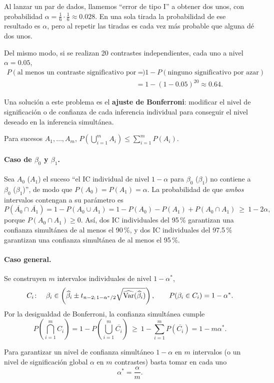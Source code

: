 \begin{ejemplo}
  Al lanzar un par de dados, llamemos ``error de tipo I'' a obtener dos unos, con probabilidad
  $\alpha=\frac16\cdot\frac16\approx0.028$. En una sola tirada la probabilidad de ese resultado
  es $\alpha$,
  pero al repetir las tiradas es cada vez más probable que alguna dé dos unos.

  Del mismo modo, si se realizan 20 contrastes independientes, cada uno a nivel $\alpha=0.05$,
  \begin{align*}
    P(\text{al menos un contraste significativo por azar})
    &= 1 - P(\text{ninguno significativo por azar}) \\
    &= 1-(1-0.05)^{20} \approx 0.64 .
  \end{align*}
\end{ejemplo}

Una solución a este problema es el \textbf{ajuste de Bonferroni}: modificar el nivel de
significación o de confianza de cada inferencia individual para conseguir el nivel deseado en la
inferencia simultánea.

\begin{proposicion}
  Para sucesos $A_1,\ldots,A_m$,
  \(
    P\left(\bigcup_{i=1}^m A_i\right) \le \sum_{i=1}^m P(A_i).
  \)
\end{proposicion}

\paragraph{Caso de $\beta_0$ y $\beta_1$.} Sea $A_0$ ($A_1$) el suceso ``el IC individual de
nivel $1-\alpha$ para $\beta_0$ ($\beta_1$) no contiene a $\beta_0$ ($\beta_1$)'', de modo que
$P(A_0)=P(A_1)=\alpha$. La probabilidad de que \emph{ambos} intervalos contengan a su parámetro
es
\[
  P(\overline{A_0}\cap\overline{A_1}) = 1-P(A_0\cup A_1)
  = 1-P(A_0)-P(A_1)+P(A_0\cap A_1) \ \ge\ 1-2\alpha ,
\]
porque $P(A_0\cap A_1)\ge0$. Así, dos IC individuales del 95\,\% garantizan una confianza
simultánea de al menos el 90\,\%, y dos IC individuales del 97.5\,\% garantizan una confianza
simultánea de al menos el 95\,\%.

\paragraph{Caso general.} Se construyen $m$ intervalos individuales de nivel $1-\alpha^*$,
\[
  C_i\colon\quad \beta_i \in \left(\widehat{\beta}_i \pm t_{n-2;\,1-\alpha^*/2}
  \sqrt{\widehat{\operatorname{Var}}(\widehat{\beta}_i)}\right),
  \qquad P(\beta_i\in C_i)=1-\alpha^* .
\]
Por la desigualdad de Bonferroni, la confianza simultánea cumple
\[
  P\left(\bigcap_{i=1}^m C_i\right)
  = 1-P\left(\bigcup_{i=1}^m \overline{C_i}\right)
  \ \ge\ 1-\sum_{i=1}^m P(\overline{C_i}) = 1-m\alpha^* .
\]

\begin{resumen}
  Para garantizar un nivel de confianza simultáneo $1-\alpha$ en $m$ intervalos (o un nivel de
  significación global $\alpha$ en $m$ contrastes) basta tomar en cada uno
  \[
    \alpha^* = \frac{\alpha}{m}.
  \]
\end{resumen}
